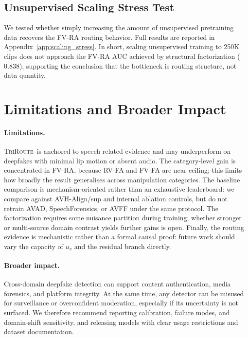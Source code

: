 \documentclass{article}
\newcommand{\method}{\textsc{TriRoute}}
\begin{document}
\subsection{Unsupervised Scaling Stress Test}
\label{sec:scaling_stress}

We tested whether simply increasing the amount of unsupervised pretraining data recovers the FV-RA routing behavior. Full results are reported in Appendix~\ref{app:scaling_stress}. In short, scaling unsupervised training to 250K clips does not approach the FV-RA AUC achieved by structural factorization ($0.838$), supporting the conclusion that the bottleneck is routing structure, not data quantity.

\section{Limitations and Broader Impact}
\paragraph{Limitations.}
\method\ is anchored to speech-related evidence and may underperform on deepfakes with minimal lip motion or absent audio. The category-level gain is concentrated in FV-RA, because RV-FA and FV-FA are near ceiling; this limits how broadly the result generalises across manipulation categories. The baseline comparison is mechanism-oriented rather than an exhaustive leaderboard: we compare against AVH-Align/sup and internal ablation controls, but do not retrain AVAD, SpeechForensics, or AVFF under the same protocol. The factorization requires some nuisance partition during training; whether stronger or multi-source domain contrast yields further gains is open. Finally, the routing evidence is mechanistic rather than a formal causal proof: future work should vary the capacity of $u_v$ and the residual branch directly.

\paragraph{Broader impact.}
Cross-domain deepfake detection can support content authentication, media forensics, and platform integrity. At the same time, any detector can be misused for surveillance or overconfident moderation, especially if its uncertainty is not surfaced. We therefore recommend reporting calibration, failure modes, and domain-shift sensitivity, and releasing models with clear usage restrictions and dataset documentation.
\end{document}
